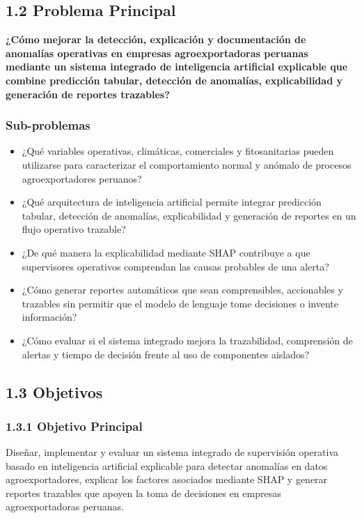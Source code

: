 \subsection{1.2 Problema Principal}\label{problema-principal}

\textbf{¿Cómo mejorar la detección, explicación y documentación de
anomalías operativas en empresas agroexportadoras peruanas mediante un
sistema integrado de inteligencia artificial explicable que combine
predicción tabular, detección de anomalías, explicabilidad y generación
de reportes trazables?}

\subsubsection{Sub-problemas}\label{sub-problemas}

\begin{itemize}
\tightlist
\item
  ¿Qué variables operativas, climáticas, comerciales y fitosanitarias
  pueden utilizarse para caracterizar el comportamiento normal y anómalo
  de procesos agroexportadores peruanos?
\item
  ¿Qué arquitectura de inteligencia artificial permite integrar
  predicción tabular, detección de anomalías, explicabilidad y
  generación de reportes en un flujo operativo trazable?
\item
  ¿De qué manera la explicabilidad mediante SHAP contribuye a que
  supervisores operativos comprendan las causas probables de una alerta?
\item
  ¿Cómo generar reportes automáticos que sean comprensibles, accionables
  y trazables sin permitir que el modelo de lenguaje tome decisiones o
  invente información?
\item
  ¿Cómo evaluar si el sistema integrado mejora la trazabilidad,
  comprensión de alertas y tiempo de decisión frente al uso de
  componentes aislados?
\end{itemize}

\subsection{1.3 Objetivos}\label{objetivos}

\subsubsection{1.3.1 Objetivo Principal}\label{objetivo-principal}

Diseñar, implementar y evaluar un sistema integrado de supervisión
operativa basado en inteligencia artificial explicable para detectar
anomalías en datos agroexportadores, explicar los factores asociados
mediante SHAP y generar reportes trazables que apoyen la toma de
decisiones en empresas agroexportadoras peruanas.

